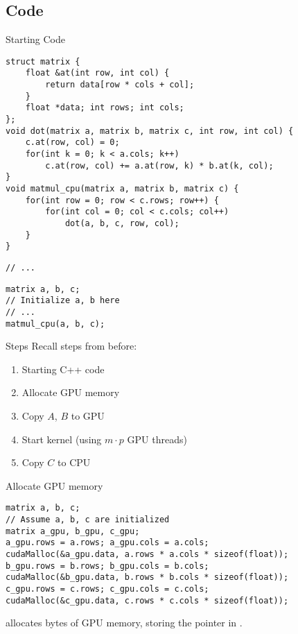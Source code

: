 \subsection{Code}\label{subsec:code}
\begin{frame}[fragile]{Starting Code}
    \begin{verbatim}
struct matrix {
    float &at(int row, int col) {
        return data[row * cols + col];
    }
    float *data; int rows; int cols;
};
void dot(matrix a, matrix b, matrix c, int row, int col) {
    c.at(row, col) = 0;
    for(int k = 0; k < a.cols; k++)
        c.at(row, col) += a.at(row, k) * b.at(k, col);
}
void matmul_cpu(matrix a, matrix b, matrix c) {
    for(int row = 0; row < c.rows; row++) {
        for(int col = 0; col < c.cols; col++)
            dot(a, b, c, row, col);
    }
}
    \end{verbatim}
    \texttt{// ...}
    \begin{verbatim}
matrix a, b, c;
// Initialize a, b here
// ...
matmul_cpu(a, b, c);
    \end{verbatim}
\end{frame}

\begin{frame}{Steps}
    Recall steps from before:
    \begin{enumerate}
        \item<+-> Starting C++ code
        \item<+-> Allocate GPU memory
        \item<+-> Copy $A$, $B$ to GPU
        \item<+-> Start kernel (using $m \cdot p$ GPU threads)
        \item<+-> Copy $C$ to CPU
    \end{enumerate}
\end{frame}

\begin{frame}[fragile]{Allocate GPU memory}
    \begin{verbatim}
matrix a, b, c;
// Assume a, b, c are initialized
matrix a_gpu, b_gpu, c_gpu;
a_gpu.rows = a.rows; a_gpu.cols = a.cols;
cudaMalloc(&a_gpu.data, a.rows * a.cols * sizeof(float));
b_gpu.rows = b.rows; b_gpu.cols = b.cols;
cudaMalloc(&b_gpu.data, b.rows * b.cols * sizeof(float));
c_gpu.rows = c.rows; c_gpu.cols = c.cols;
cudaMalloc(&c_gpu.data, c.rows * c.cols * sizeof(float));
    \end{verbatim}

     allocates  bytes of GPU memory, storing the pointer in .
\end{frame}

